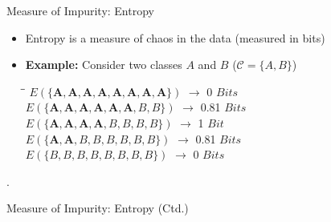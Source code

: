 \begin{frame}{Measure of Impurity: Entropy}{}
	\begin{itemize}
		\item Entropy is a measure of chaos in the data (measured in bits)
		\item \textbf{Example:} Consider two classes $A$ and $B$ ($\mathcal{C} = \{ A, B \}$)
	
		\footnotesize
		\begin{tabbing}
			\hspace*{5cm}\=\hspace*{1.5cm}\= \kill
			$E(\{ \bm{A}, \bm{A}, \bm{A}, \bm{A}, \bm{A}, \bm{A}, \bm{A}, \bm{A} \})$
				\>	$\rightarrow$ 0		\>	$Bits$	\\
			$E(\{ \bm{A}, \bm{A}, \bm{A}, \bm{A}, \bm{A}, \bm{A}, B, B \})$
				\>	$\rightarrow$ 0.81 	\>	$Bits$	\\
			$E(\{ \bm{A}, \bm{A}, \bm{A}, \bm{A}, B, B, B, B \})$
				\>	$\rightarrow$ 1		\>	$Bit$		\\
			$E(\{ \bm{A}, \bm{A}, B, B, B, B, B, B \})$
				\>	$\rightarrow$ 0.81 	\>	$Bits$	\\
			$E(\{ B, B, B, B, B, B, B, B \})$	
				\>	$\rightarrow$ 0		\>	$Bits$
		\end{tabbing}
		\normalsize
	\end{itemize}
	
	\begin{boxBlueNoFrame}
		\footnotesize
		.
	\end{boxBlueNoFrame}
\end{frame}


\begin{frame}{Measure of Impurity: Entropy (Ctd.)}{}
	
\end{frame}


